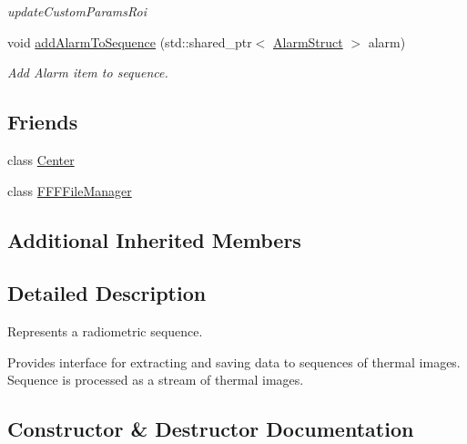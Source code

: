 \begin{DoxyCompactItemize}
\begin{DoxyCompactList}\small\item\em update\+Custom\+Params\+Roi \end{DoxyCompactList}\item 
void \hyperlink{classwtl_1_1_sequence_radiometric_a3117b737de49b7f1b0963a233fc6e463}{add\+Alarm\+To\+Sequence} (std\+::shared\+\_\+ptr$<$ \hyperlink{structwtl_1_1_alarm_struct}{Alarm\+Struct} $>$ alarm)
\begin{DoxyCompactList}\small\item\em Add Alarm item to sequence. \end{DoxyCompactList}\end{DoxyCompactItemize}
\subsection*{Friends}
\begin{DoxyCompactItemize}
\item 
class \hyperlink{classwtl_1_1_sequence_radiometric_a5baf0a1f190dbaabf7033b4ba92f4c81}{Center}
\item 
class \hyperlink{classwtl_1_1_sequence_radiometric_a89f52b56f7155da8da3c26ad5feb1bcc}{F\+F\+F\+File\+Manager}
\end{DoxyCompactItemize}
\subsection*{Additional Inherited Members}


\subsection{Detailed Description}
Represents a radiometric sequence. 

Provides interface for extracting and saving data to sequences of thermal images. Sequence is processed as a stream of thermal images. 

\subsection{Constructor \& Destructor Documentation}
\mbox{\label{classwtl_1_1_sequence_radiometric_a2cc32b5a5bad40a78f78aa1388b98fff}} 
